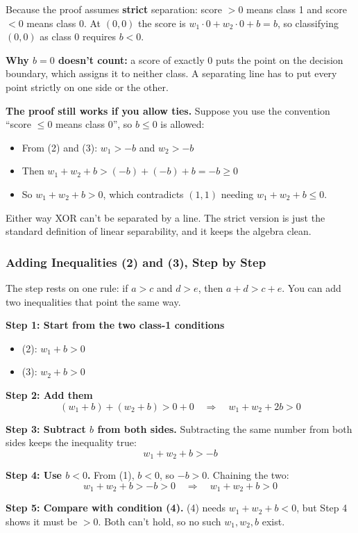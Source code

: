 Because the proof assumes \textbf{strict} separation: score $> 0$ means class 1 and score $< 0$ means class 0. At $(0,0)$ the score is $w_1 \cdot 0 + w_2 \cdot 0 + b = b$, so classifying $(0,0)$ as class 0 requires $b < 0$.

\textbf{Why $b = 0$ doesn't count:} a score of exactly 0 puts the point on the decision boundary, which assigns it to neither class. A separating line has to put every point strictly on one side or the other.

\textbf{The proof still works if you allow ties.} Suppose you use the convention ``score $\le 0$ means class 0'', so $b \le 0$ is allowed:
\begin{itemize}
  \item From (2) and (3): $w_1 > -b$ and $w_2 > -b$
  \item Then $w_1 + w_2 + b > (-b) + (-b) + b = -b \ge 0$
  \item So $w_1 + w_2 + b > 0$, which contradicts $(1,1)$ needing $w_1 + w_2 + b \le 0$.
\end{itemize}
Either way XOR can't be separated by a line. The strict version is just the standard definition of linear separability, and it keeps the algebra clean.

\subsubsection*{Adding Inequalities (2) and (3), Step by Step}

The step rests on one rule: if $a > c$ and $d > e$, then $a + d > c + e$. You can add two inequalities that point the same way.

\textbf{Step 1: Start from the two class-1 conditions}
\begin{itemize}
  \item (2): $w_1 + b > 0$
  \item (3): $w_2 + b > 0$
\end{itemize}

\textbf{Step 2: Add them}
\[
(w_1 + b) + (w_2 + b) > 0 + 0 \quad\Longrightarrow\quad w_1 + w_2 + 2b > 0
\]

\textbf{Step 3: Subtract $b$ from both sides.} Subtracting the same number from both sides keeps the inequality true:
\[
w_1 + w_2 + b > -b
\]

\textbf{Step 4: Use $b < 0$.} From (1), $b < 0$, so $-b > 0$. Chaining the two:
\[
w_1 + w_2 + b > -b > 0 \quad\Longrightarrow\quad w_1 + w_2 + b > 0
\]

\textbf{Step 5: Compare with condition (4).} (4) needs $w_1 + w_2 + b < 0$, but Step 4 shows it must be $> 0$. Both can't hold, so no such $w_1, w_2, b$ exist.


